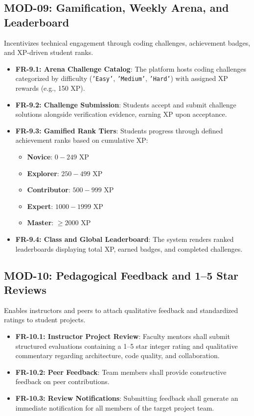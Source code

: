 \documentclass{scrreprt}
\begin{document}
\subsection{MOD-09: Gamification, Weekly Arena, and Leaderboard}
Incentivizes technical engagement through coding challenges, achievement badges, and XP-driven student ranks.
\begin{itemize}
    \item \textbf{FR-9.1: Arena Challenge Catalog}: The platform hosts coding challenges categorized by difficulty (\texttt{'Easy'}, \texttt{'Medium'}, \texttt{'Hard'}) with assigned XP rewards (e.g., 150 XP).
    \item \textbf{FR-9.2: Challenge Submission}: Students accept and submit challenge solutions alongside verification evidence, earning XP upon acceptance.
    \item \textbf{FR-9.3: Gamified Rank Tiers}: Students progress through defined achievement ranks based on cumulative XP:
    \begin{itemize}
        \item \textbf{Novice}: $0 - 249$ XP
        \item \textbf{Explorer}: $250 - 499$ XP
        \item \textbf{Contributor}: $500 - 999$ XP
        \item \textbf{Expert}: $1000 - 1999$ XP
        \item \textbf{Master}: $\ge 2000$ XP
    \end{itemize}
    \item \textbf{FR-9.4: Class and Global Leaderboard}: The system renders ranked leaderboards displaying total XP, earned badges, and completed challenges.
\end{itemize}

\subsection{MOD-10: Pedagogical Feedback and 1--5 Star Reviews}
Enables instructors and peers to attach qualitative feedback and standardized ratings to student projects.
\begin{itemize}
    \item \textbf{FR-10.1: Instructor Project Review}: Faculty mentors shall submit structured evaluations containing a 1--5 star integer rating and qualitative commentary regarding architecture, code quality, and collaboration.
    \item \textbf{FR-10.2: Peer Feedback}: Team members shall provide constructive feedback on peer contributions.
    \item \textbf{FR-10.3: Review Notifications}: Submitting feedback shall generate an immediate notification for all members of the target project team.
\end{itemize}
\end{document}
